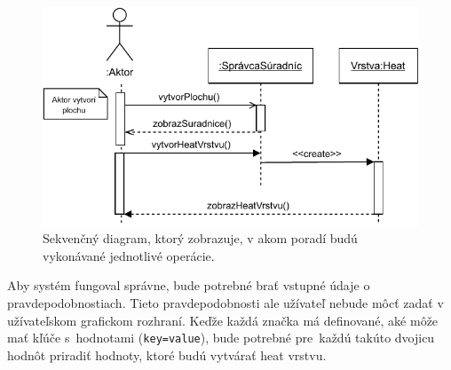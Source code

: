 \begin{figure}[h]
    \centering
    \includegraphics[width=0.9\linewidth]{obrazky-figures/seq-diagram.pdf}
    \caption{Sekvenčný diagram, ktorý zobrazuje, v akom poradí budú vykonávané jednotlivé operácie.}
    \label{fig:navrh-diagram}
\end{figure}

Aby systém fungoval správne, bude potrebné brať vstupné údaje o pravdepodobnostiach. Tieto pravdepodobnosti ale užívateľ nebude môcť zadať v užívateľskom grafickom rozhraní. Keďže každá značka má definované, aké môže mať kľúče s~hodnotami (\texttt{key=value}), bude potrebné pre~každú takúto dvojicu hodnôt priradiť hodnoty, ktoré budú vytvárať heat vrstvu. 












